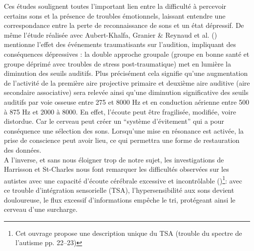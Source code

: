 Ces études soulignent toutes 
l'important  lien entre la difficulté
à percevoir certains sons et la présence de troubles émotionnels,
laissant entendre une correspondance 
entre la perte de reconnaissance de
sons et un état dépressif.
De même l'étude réalisée avec Aubert-Khalfa, Granier \& Reynaud et al. (\citeyear{affectiveDisorders})
 mentionne l'effet des événements
traumatisants sur l'audition, impliquant des conséquences dépressives :
la double approche groupale (groupe en bonne santé et groupe déprimé avec
troubles de stress post-traumatique) met en lumière la diminution des
  seuils auditifs.
Plus précisément cela signifie qu'une augmentation de l'activité de la
première aire projective primaire et deuxième aire auditive (aire
secondaire associative) sera relevée ainsi qu'une 
diminution significative des
seuils auditifs par voie osseuse  entre
275 et 8000 Hz et en conduction aérienne entre 
500 à 875 Hz et  2000 à 8000.
En effet,  l'écoute peut être fragilisée, modifiée, voire distordue. Car le cerveau peut créer  
un \enquote{système d'évitement} \autocite[cf.][155]{Kabat-Zinn} qui a pour conséquence une sélection 
des sons. 
Lorsqu'une mise en résonance est activée, la prise de conscience peut avoir lieu, ce qui permettra une 
forme de restauration des données.
\\
A l'inverse, et sans nous éloigner trop de notre sujet, les investigations de Harrisson et St-Charles nous 
font remarquer 
les difficultés observées sur les
autistes avec une capacité d'écoute cérébrale excessive et
incontrôlable (\citeyear{harrisson_autisme_2017})\footnote{Cet ouvrage propose une description unique 
du TSA
   (trouble du spectre de l'autisme
   pp. 22--23)}: avec ce trouble d'intégration sensorielle (TSA),
 l'hypersensibilité aux sons devient douloureuse, le flux excessif d'informations empêche le tri, 
 protégeant ainsi le cerveau d'une surcharge.


